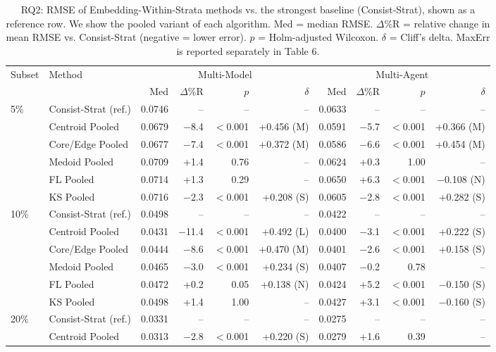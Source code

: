 \begin{table}[t]
\centering
\caption{RQ2: RMSE of Embedding-Within-Strata methods vs. the strongest baseline (Consist-Strat), shown as a reference row. We show the pooled variant of each algorithm. Med = median RMSE. $\Delta$\%R = relative change in mean RMSE vs. Consist-Strat (negative = lower error). $p$ = Holm-adjusted Wilcoxon. $\delta$ = Cliff's delta. MaxErr is reported separately in Table 6.}
\label{tab:rq2-rmse}
\begin{tabular}{llrrrrrrrr}
\toprule
Subset & Method & \multicolumn{4}{c}{Multi-Model} & \multicolumn{4}{c}{Multi-Agent} \\
 &  & Med & $\Delta$\%R & $p$ & $\delta$ & Med & $\Delta$\%R & $p$ & $\delta$ \\
\midrule
5\% & Consist-Strat (ref.) & 0.0746 & -- & -- & -- & 0.0633 & -- & -- & -- \\
 & Centroid Pooled & 0.0679 & $-$8.4 & $<$0.001 & +0.456 (M) & 0.0591 & $-$5.7 & $<$0.001 & +0.366 (M) \\
 & Core/Edge Pooled & 0.0677 & $-$7.4 & $<$0.001 & +0.372 (M) & 0.0586 & $-$6.6 & $<$0.001 & +0.454 (M) \\
 & Medoid Pooled & 0.0709 & +1.4 & 0.76 & -- & 0.0624 & +0.3 & 1.00 & -- \\
 & FL Pooled & 0.0714 & +1.3 & 0.29 & -- & 0.0650 & +6.3 & $<$0.001 & $-$0.108 (N) \\
 & KS Pooled & 0.0716 & $-$2.3 & $<$0.001 & +0.208 (S) & 0.0605 & $-$2.8 & $<$0.001 & +0.282 (S) \\
\midrule
10\% & Consist-Strat (ref.) & 0.0498 & -- & -- & -- & 0.0422 & -- & -- & -- \\
 & Centroid Pooled & 0.0431 & $-$11.4 & $<$0.001 & +0.492 (L) & 0.0400 & $-$3.1 & $<$0.001 & +0.222 (S) \\
 & Core/Edge Pooled & 0.0444 & $-$8.6 & $<$0.001 & +0.470 (M) & 0.0401 & $-$2.6 & $<$0.001 & +0.158 (S) \\
 & Medoid Pooled & 0.0465 & $-$3.0 & $<$0.001 & +0.234 (S) & 0.0407 & $-$0.2 & 0.78 & -- \\
 & FL Pooled & 0.0472 & +0.2 & 0.05 & +0.138 (N) & 0.0424 & +5.2 & $<$0.001 & $-$0.150 (S) \\
 & KS Pooled & 0.0498 & +1.4 & 1.00 & -- & 0.0427 & +3.1 & $<$0.001 & $-$0.160 (S) \\
\midrule
20\% & Consist-Strat (ref.) & 0.0331 & -- & -- & -- & 0.0275 & -- & -- & -- \\
 & Centroid Pooled & 0.0313 & $-$2.8 & $<$0.001 & +0.220 (S) & 0.0279 & +1.6 & 0.39 & -- \\

\end{tabular}
\end{table}
